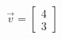 \documentclass[preview]{standalone}
\begin{document}
\begin{align*}
\vec{v} = \begin{bmatrix} 4 \\ 3 \end{bmatrix}
\end{align*}
\end{document}
